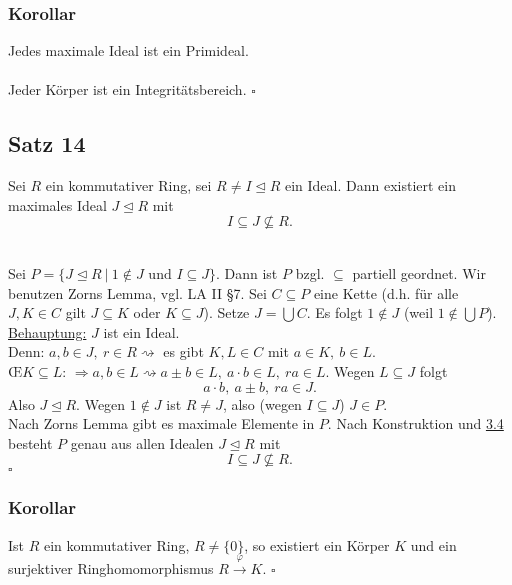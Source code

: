 \subsubsection*{Korollar}
Jedes maximale Ideal ist ein Primideal.\\

\\
Jeder Körper ist ein Integritätsbereich.
\hfill $\square$

\subsection{Satz 14}
\label{sub:satz_14}
Sei $R$ ein kommutativer Ring, sei $R\neq I\trianglelefteq R$ ein Ideal.
Dann existiert ein maximales Ideal $J\trianglelefteq R$ mit 
\[
I\subseteq J\nsubseteq R.
\]

\\
Sei $P=\{J\trianglelefteq R~|~1\notin J\text{ und }I\subseteq J \}$.
Dann ist $P$ bzgl. $\subseteq$ partiell geordnet.
Wir benutzen Zorns Lemma, vgl. LA II §7.
Sei $C\subseteq P$ eine Kette (d.h. für alle $J,K\in C$ gilt $J\subseteq K$ oder $K\subseteq J$).
Setze $J=\bigcup C$.
Es folgt $1\notin J$ (weil $1\notin \bigcup P$).\\
\uline{Behauptung:} $J$ ist ein Ideal.\\
Denn: $a,b\in J,~r\in R\rightsquigarrow$ es gibt $K,L\in C$ mit $a\in K,~b\in L$.\\
\OE $K\subseteq L$: $\Rightarrow a,b\in L\rightsquigarrow a\pm b\in L,~a\cdot b\in L,~ra\in L$.
Wegen $L\subseteq J$ folgt
\[
a\cdot b,~a\pm b,~ ra\in J.
\]
Also $J\trianglelefteq R$.
Wegen $1\notin J$ ist $R\neq J$, also (wegen $I\subseteq J$) $J\in P$.\\
Nach Zorns Lemma gibt es maximale Elemente in $P$.
Nach Konstruktion und \hyperref[sub:homomor_ideale]{3.4} besteht $P$ genau aus allen Idealen $J\trianglelefteq R$ mit
\[
I\subseteq J\nsubseteq R.
\]
\hfill $\square$

\subsubsection*{Korollar}
Ist $R$ ein kommutativer Ring, $R\neq \{0\}$, so existiert ein Körper $K$ und ein surjektiver Ringhomomorphismus $R\stackrel{\varphi}{\to}K$.
\hfill $\square$

